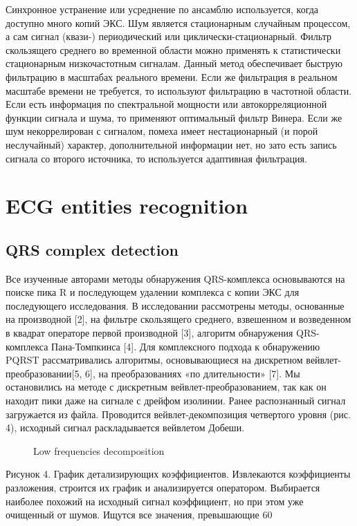 \documentclass[runningheads]{AIIT}
\begin{document}
Синхронное устранение или усреднение по ансамблю используется, когда доступно много копий ЭКС. Шум является стационарным случайным процессом, а сам сигнал (квази-) периодический или циклически-стационарный. Фильтр скользящего среднего во временной области можно применять к статистически стационарным низкочастотным сигналам. Данный метод обеспечивает быструю фильтрацию в масштабах реального времени. Если же фильтрация в реальном масштабе времени не требуется, то используют фильтрацию в частотной области. Если есть информация по спектральной мощности или автокорреляционной функции сигнала и шума, то применяют оптимальный фильтр Винера. Если же шум некоррелирован с сигналом, помеха имеет нестационарный (и порой неслучайный) характер, дополнительной информации нет, но зато есть запись сигнала со второго источника, то используется адаптивная фильтрация.

\section{ECG entities recognition}
\label{sec:ecg-etit-recogn}

\subsection{QRS complex detection}
\label{sec:qrs-compl-detect}

Все изученные авторами методы обнаружения QRS-комплекса основываются на поиске пика R и последующем удалении комплекса с копии ЭКС для последующего исследования. В исследовании рассмотрены методы, основанные на производной [2], на фильтре скользящего среднего, взвешенном и возведенном в квадрат операторе первой производной [3], алгоритм обнаружения QRS-комплекса Пана-Томпкинса [4]. Для комплексного подхода к обнаружению PQRST рассматривались алгоритмы, основывающиеся на дискретном вейвлет-преобразовании[5, 6], на преобразованиях «по длительности» [7].
Мы остановились на методе с дискретным вейвлет-преобразованием, так как он находит пики даже на сигнале с дрейфом изолинии.
Ранее распознанный сигнал загружается из файла. Проводится вейвлет-декомпозиция четвертого уровня (рис. 4), исходный сигнал раскладывается вейвлетом Добеши.


\begin{figure}[htb]
  \centering

  \caption{Low frequencies decomposition}
  \label{fig:decomp}
\end{figure}

Рисунок 4. График детализирующих коэффициентов.
Извлекаются коэффициенты разложения, строится их график и анализируется оператором. Выбирается наиболее похожий на исходный сигнал коэффициент, но при этом уже очищенный от шумов. Ищутся все значения, превышающие 60%
\end{document}
